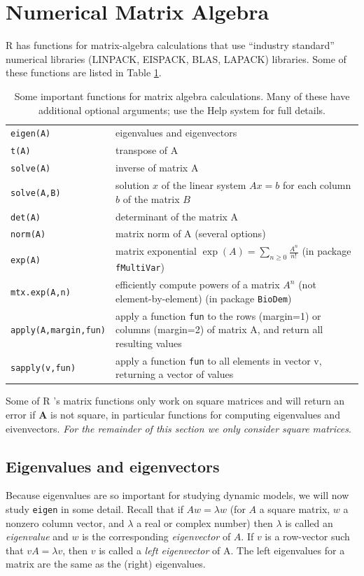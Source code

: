 \documentclass [11pt]{article}
\newcommand{\ttt}[1]{\texttt{#1}}
\numberwithin{exercise}{section}
\def\R{R }
\begin{document}
\section{Numerical Matrix Algebra} \label{MatComp}
\R has functions for matrix-algebra calculations that use ``industry standard'' 
numerical libraries (LINPACK, EISPACK, BLAS, LAPACK) libraries. Some of these functions are listed in 
Table \ref{LinAlgFunctions}. 

\begin{table}[t]
\begin{tabular}{p{120pt}p{300pt}}
\hline
{\tt eigen(A)} & eigenvalues and eigenvectors \\
{\tt t(A)} & transpose of A \\
{\tt solve(A)} & inverse of matrix A \\
{\tt solve(A,B)} & solution $x$ of the linear system $Ax=b$ for each column $b$ of the matrix $B$\\
{\tt det(A)} & determinant of the matrix A \\
{\tt norm(A)} & matrix norm of A (several options)\\
{\tt exp(A)} & matrix exponential $\exp(A)=\sum\limits_{n \geqslant 0}\frac{A^n}{n!}$ (in package \ttt{fMultiVar}) \\ 
{\tt mtx.exp(A,n)} & efficiently compute powers of a matrix $A^n$ (not element-by-element) (in package \ttt{BioDem}) \\
{\tt apply(A,margin,fun)} & apply a function \ttt{fun} to the rows (margin=1) or columns (margin=2) of matrix A,
and return all resulting values \\
{\tt sapply(v,fun)} & apply a function \ttt{fun} to all elements in vector v, returning a vector of values \\
\hline
\end{tabular}
\caption{Some important functions for matrix algebra calculations. Many
of these have additional optional arguments; use the Help system for full details.}
\label{LinAlgFunctions}
\end{table}


Some of \R's matrix functions only work on square matrices and will return an error if 
\textbf{A} is not square, in particular functions for computing eigenvalues and
eivenvectors. \textit{For the remainder of this section we only 
consider square matrices}. 

\subsection{Eigenvalues and eigenvectors}
Because eigenvalues are so important for studying dynamic models, we will now 
study \texttt{eigen} in some detail. Recall that if $Aw=\lambda w$ (for $A$ a square matrix,
$w$ a nonzero column vector, and $\lambda$ a real or complex number) then $\lambda$
is called an \textit{eigenvalue} and $w$ is the corresponding \textit{eigenvector} of $A$. 
If $v$ is a row-vector such that $vA= \lambda v$, then $v$ is called a \textit{left
eigenvector} of A. The left eigenvalues for a matrix are the same as the (right) 
eigenvalues.
\end{document}
